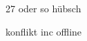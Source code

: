 \documentclass[paper=a4,13pt,ngerman]{scrartcl}
\begin{document}
27 oder so 
hübsch

konflikt inc offline
\end{document}
